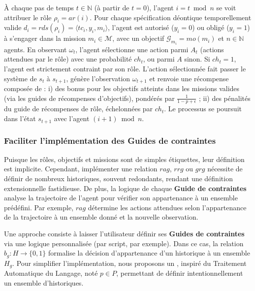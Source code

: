 À chaque pas de temps $t \in \mathbb{N}$ (à partir de $t=0$), l'agent $i = t \bmod n$ se voit attribuer le rôle $\rho_i = ar(i)$. Pour chaque spécification déontique temporellement valide $d_i = rds(\rho_i) = \langle tc_i, y_i, m_i \rangle$, l'agent est autorisé ($y_i = 0$) ou obligé ($y_i = 1$) à s'engager dans la mission $m_i \in \mathcal{M}$, avec un objectif $\mathcal{G}_{m_i} = mo(m_i)$ et $n \in \mathbb{N}$ agents.
%
En observant $\omega_t$, l'agent sélectionne une action parmi $A_t$ (actions attendues par le rôle) avec une probabilité $ch_t$, ou parmi $A$ sinon. Si $ch_t = 1$, l'agent est strictement contraint par son rôle.
%
L'action sélectionnée fait passer le système de $s_t$ à $s_{t+1}$, génère l'observation $\omega_{t+1}$ et renvoie une récompense composée de :
i) des bonus pour les objectifs atteints dans les missions valides (via les guides de récompenses d'objectifs), pondérés par $\frac{1}{1 - p + \epsilon}$ ;
ii) des pénalités du guide de récompenses de rôle, échelonnées par $ch_t$.
%
Le processus se poursuit dans l'état $s_{t+1}$ avec l'agent $(i + 1) \bmod n$.

\subsubsection*{Faciliter l'implémentation des \textbf{Guides de contraintes}}

Puisque les rôles, objectifs et missions sont de simples étiquettes, leur définition est implicite. Cependant, implémenter une relation \(rag\), \(rrg\) ou \(grg\) nécessite de définir de nombreux historiques, souvent redondants, rendant une définition extensionnelle fastidieuse. De plus, la logique de chaque \textbf{Guide de contraintes} analyse la trajectoire de l'agent pour vérifier son appartenance à un ensemble prédéfini. Par exemple, \(rag\) détermine les actions attendues selon l'appartenance de la trajectoire à un ensemble donné et la nouvelle observation.

Une approche consiste à laisser l'utilisateur définir ses \textbf{Guides de contraintes} via une logique personnalisée (par script, par exemple). Dans ce cas, la relation \(b_g: H \to \{0,1\}\) formalise la décision d'appartenance d'un historique à un ensemble \(H_g\).
Pour simplifier l'implémentation, nous proposons un , inspiré du Traitement Automatique du Langage, noté \(p \in P\), permettant de définir intentionnellement un ensemble d'historiques.

